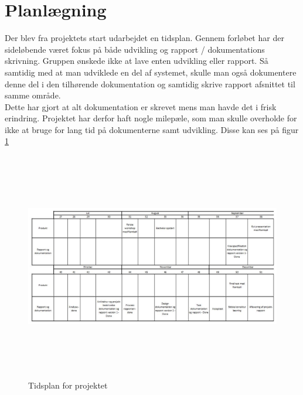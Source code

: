 \section{Planlægning}
Der blev fra projektets start udarbejdet en tidsplan.
Gennem forløbet har der sideløbende været fokus på både udvikling og rapport / dokumentations skrivning.
Gruppen ønskede ikke at lave enten udvikling eller rapport. Så samtidig med at man udviklede en del af systemet, skulle man også dokumentere denne del i den tilhørende dokumentation og samtidig skrive rapport afsnittet til samme område. \\
Dette har gjort at alt dokumentation er skrevet mens man havde det i frisk erindring.
Projektet har derfor haft nogle milepæle, som man skulle overholde for ikke at bruge for lang tid på dokumenterne samt udvikling. Disse kan ses på figur \ref{fig:Tidsplan}

\begin{figure} [H]
	\begin{center}
		\includegraphics[height=10cm, width=18cm]{Moeder/Tidsplan}
	\end{center}
	\caption{Tidsplan for projektet}
	\label{fig:Tidsplan}
\end{figure}

\clearpage

